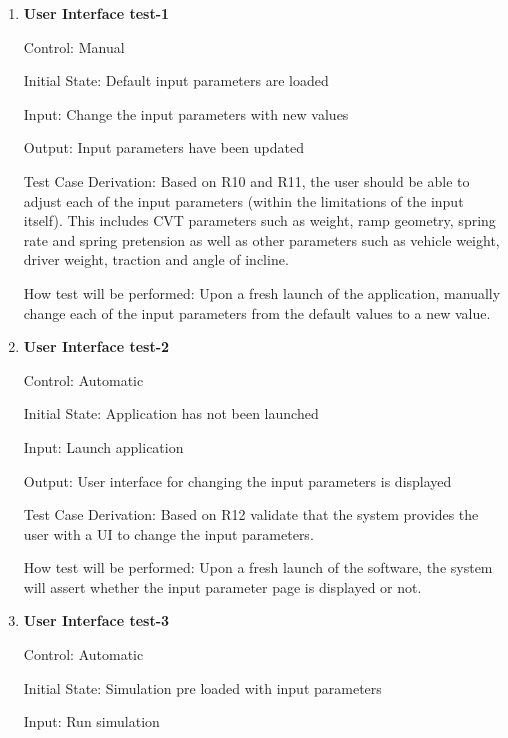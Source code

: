 \documentclass[12pt, titlepage]{article}
\begin{document}
\begin{enumerate}

  \item {} \hypertarget{User Interface test-1}{\textbf{User Interface test-1}} \label{User Interface test-1}
  
  Control: Manual

  Initial State: Default input parameters are loaded
            
  Input: Change the input parameters with new values
            
  Output: Input parameters have been updated 
  
  Test Case Derivation: Based on R10 and R11, the user should be able to adjust each of the input parameters (within the limitations of the input itself).
  This includes CVT parameters such as weight, ramp geometry, spring rate and spring pretension as well as other parameters such as vehicle weight, driver weight, traction and angle of incline. 
  
  How test will be performed: Upon a fresh launch of the application, manually change each of the input parameters from the default values to a new value. 
             
  \item {} \hypertarget{User Interface test-2}{\textbf{User Interface test-2}} \label{User Interface test-2}
 
  Control: Automatic
            
  Initial State: Application has not been launched
            
  Input: Launch application
            
  Output: User interface for changing the input parameters is displayed
  
  Test Case Derivation: Based on R12 validate that the system provides the user with a UI to change the input parameters.
  
  How test will be performed: Upon a fresh launch of the software, the system will assert whether the input parameter page is displayed or not. 
  \item {} \hypertarget{User Interface test-3}{\textbf{User Interface test-3}} \label{User Interface test-3}
  
  Control: Automatic
            
  Initial State: Simulation pre loaded with input parameters
            
  Input: Run simulation 
            

\end{enumerate}
\end{document}
